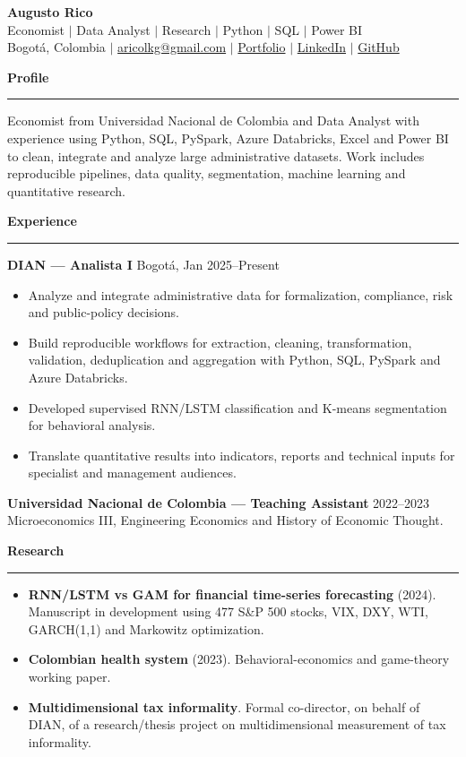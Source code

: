 \documentclass[10pt,a4paper]{article}
\newcommand{\sectiontitle}[1]{%
  \vspace{0.6em}\textbf{\large #1}\par\vspace{0.2em}\hrule\vspace{0.5em}
}
\begin{document}
{\LARGE\textbf{Augusto Rico}}\\[2pt]
Economist $|$ Data Analyst $|$ Research $|$ Python $|$ SQL $|$ Power BI\\
Bogotá, Colombia $|$ \href{mailto:aricolkg@gmail.com}{aricolkg@gmail.com} $|$
\href{https://lekillergallet.github.io/}{Portfolio} $|$
\href{https://www.linkedin.com/in/lekillergallet/}{LinkedIn} $|$
\href{https://github.com/LeKilleRGallet}{GitHub}

\sectiontitle{Profile}
Economist from Universidad Nacional de Colombia and Data Analyst with experience
using Python, SQL, PySpark, Azure Databricks, Excel and Power BI to clean,
integrate and analyze large administrative datasets. Work includes reproducible
pipelines, data quality, segmentation, machine learning and quantitative
research.

\sectiontitle{Experience}
\textbf{DIAN — Analista I} \hfill Bogotá, Jan 2025--Present
\begin{itemize}
  \item Analyze and integrate administrative data for formalization, compliance, risk and public-policy decisions.
  \item Build reproducible workflows for extraction, cleaning, transformation, validation, deduplication and aggregation with Python, SQL, PySpark and Azure Databricks.
  \item Developed supervised RNN/LSTM classification and K-means segmentation for behavioral analysis.
  \item Translate quantitative results into indicators, reports and technical inputs for specialist and management audiences.
\end{itemize}

\textbf{Universidad Nacional de Colombia — Teaching Assistant} \hfill 2022--2023\\
Microeconomics III, Engineering Economics and History of Economic Thought.

\sectiontitle{Research}
\begin{itemize}
  \item \textbf{RNN/LSTM vs GAM for financial time-series forecasting} (2024). Manuscript in development using 477 S\&P 500 stocks, VIX, DXY, WTI, GARCH(1,1) and Markowitz optimization.
  \item \textbf{Colombian health system} (2023). Behavioral-economics and game-theory working paper.
  \item \textbf{Multidimensional tax informality}. Formal co-director, on behalf of DIAN, of a research/thesis project on multidimensional measurement of tax informality.
\end{itemize}
\end{document}
